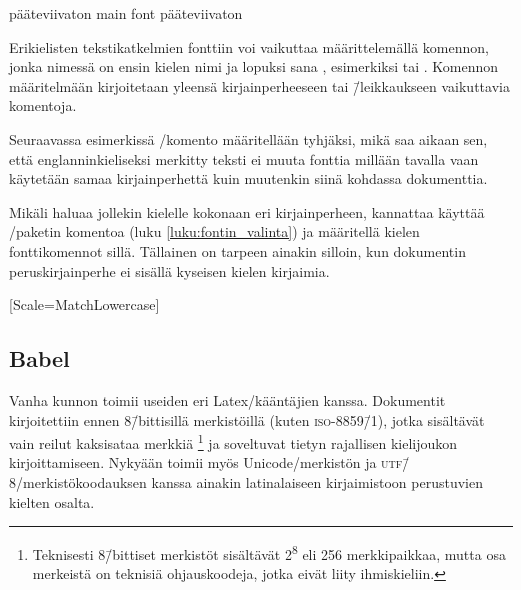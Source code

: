 \begin{tulossis}
  \sffamily pääteviivaton {\rmfamily main font} pääteviivaton
\end{tulossis}

Erikielisten tekstikatkelmien fonttiin voi vaikuttaa määrittelemällä
komennon, jonka nimessä on ensin kielen nimi ja lopuksi sana
, esimerkiksi  tai . Komennon määritelmään kirjoitetaan yleensä
kirjainperheeseen tai \=/leikkaukseen vaikuttavia komentoja.

Seuraavassa esimerkissä \-/komento
määritellään tyhjäksi, mikä saa aikaan sen, että englanninkieliseksi
merkitty teksti ei muuta fonttia millään tavalla vaan käytetään samaa
kirjainperhettä kuin muutenkin siinä kohdassa dokumenttia.

\begin{koodilohkosis}
  \newcommand{\englishfont}{}
\end{koodilohkosis}

Mikäli haluaa jollekin kielelle kokonaan eri kirjainperheen, kannattaa
käyttää \-/paketin komentoa  (luku \ref{luku:fontin_valinta}) ja määritellä
kielen fonttikomennot sillä. Tällainen on tarpeen ainakin silloin, kun
dokumentin peruskirjainperhe ei sisällä kyseisen kielen kirjaimia.

\begin{koodilohkosis}
  [Scale=MatchLowercase]
\end{koodilohkosis}


%


\subsection{Babel}

Vanha kunnon  toimii useiden eri Latex\-/kääntäjien
kanssa. Dokumentit kirjoitettiin ennen 8\=/bittisillä merkistöillä
(kuten \textsc{iso-8859\=/1}), jotka sisältävät vain reilut kaksisataa
merkkiä%
\footnote{Teknisesti 8\=/bittiset merkistöt sisältävät
  2\textsuperscript8 eli 256 merkkipaikkaa, mutta osa merkeistä on
  teknisiä ohjauskoodeja, jotka eivät liity ihmiskieliin.} %
ja soveltuvat tietyn rajallisen kielijoukon kirjoittamiseen. Nykyään
 toimii myös Unicode\-/merkistön ja
\textsc{utf\=/8}\-/merkistökoodauksen kanssa ainakin latinalaiseen
kirjaimistoon perustuvien kielten osalta.

